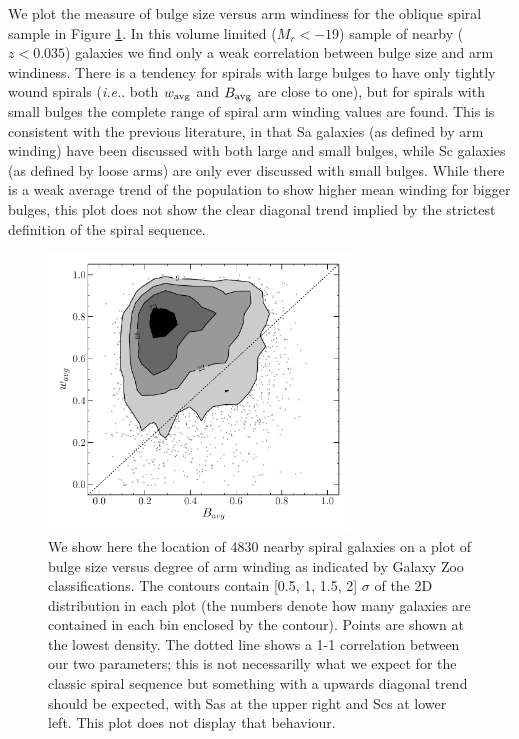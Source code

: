 \documentclass[usenatbib]{mn2e}
\newcommand{\ie}{{\it i.e.}}
\begin{document}
 We plot the measure of bulge size versus arm windiness for the oblique spiral sample in Figure \ref{bulgewinding}. In this volume limited ($M_r<-19$) sample of nearby ($z<0.035$) galaxies we find only a weak correlation between bulge size and arm windiness. There is a tendency for spirals with large bulges to have only tightly wound spirals (\ie. both $w_{\rm avg}$ and $B_{\rm avg}$ are close to one), but for spirals with small bulges the complete range of spiral arm winding values are found.  This is consistent with the previous literature, in that Sa galaxies (as defined by arm winding) have been discussed with both large and small bulges, while Sc galaxies (as defined by loose arms) are only ever discussed with small bulges. While there is a weak average trend of the population to show higher mean winding for bigger bulges, this plot does not show the clear diagonal trend implied by the strictest definition of the spiral sequence. 

 
 \begin{figure}
\includegraphics[width=80mm]{bulge_armwinding.pdf}
\caption{We show here the location of {4830} nearby spiral galaxies on a plot of bulge size versus degree of arm winding as indicated by Galaxy Zoo classifications. The contours contain [0.5, 1, 1.5, 2] $\sigma$ of the 2D distribution in each plot (the numbers denote how many galaxies are contained in each bin enclosed by the contour). Points are shown at the lowest density.  The dotted line shows a 1-1 correlation between our two parameters; this is not necessarilly what we expect for the classic spiral sequence but something with a upwards diagonal trend should be expected, with Sas at the upper right and Scs at lower left. This plot does not display that behaviour.  \label{bulgewinding}}
\end{figure}
 
\end{document}
